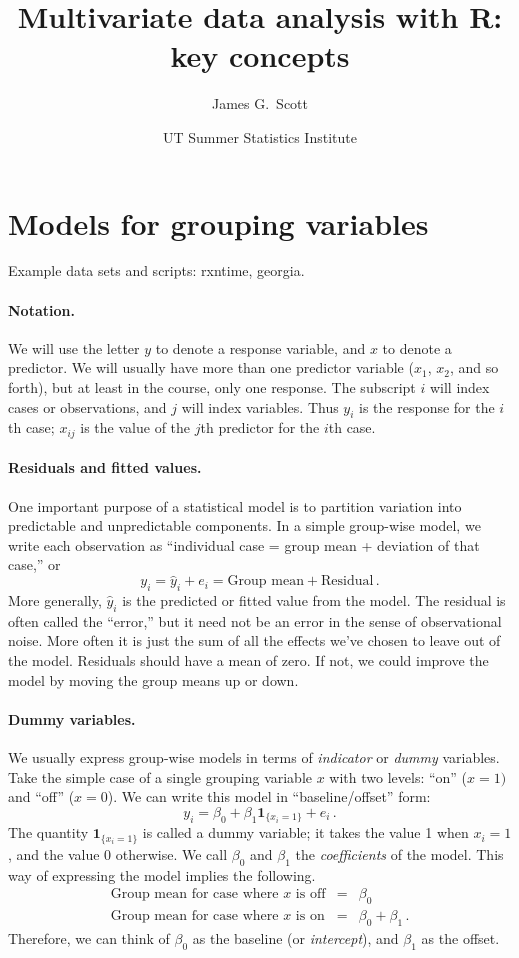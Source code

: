 \documentclass[11pt]{article}
\title{Multivariate data analysis with R: key concepts}
\author{ James G.~Scott}
\date{UT Summer Statistics Institute}  %
\newcommand{\1}[1]{\mathbf{1}_{\{ {#1} \}}}
\begin{document}

\maketitle%


\section{Models for grouping variables}
Example data sets and scripts: rxntime, georgia.

\paragraph{Notation.} We will use the letter $y$ to denote a response variable, and $x$ to denote a predictor.  We will usually have more than one predictor variable ($x_1$, $x_2$, and so forth), but at least in the course, only one response.  The subscript $i$ will index cases or observations, and $j$ will index variables.  Thus $y_i$ is the response for the $i$th case; $x_{ij}$ is the value of the $j$th predictor for the $i$th case.

\paragraph{Residuals and fitted values.}  One important purpose of a statistical model is to partition variation into predictable and unpredictable components.  In a simple group-wise model, we write each observation as ``individual case = group mean + deviation of that case,'' or
$$
y_i = \hat{y}_i + e_i = \mbox{Group mean} + \mbox{Residual} \, .
$$
More generally, $\hat{y}_i$ is the predicted or fitted value from the model.  The residual is often called the ``error,'' but it need not be an error in the sense of observational noise.  More often it is just the sum of all the effects we've chosen to leave out of the model.  Residuals should have a mean of zero.  If not, we could improve the model by moving the group means up or down.

\paragraph{Dummy variables.}  We usually express group-wise models in terms of \textit{indicator} or \textit{dummy} variables.  Take the simple case of a single grouping variable $x$ with two levels: ``on'' ($x=1)$ and ``off'' ($x=0$).  We can write this model in ``baseline/offset'' form:
$$
y_i = \beta_0 + \beta_1 \1{x_i=1} + e_i \, .
$$
The quantity $\1{x_i=1}$ is called a dummy variable; it takes the value 1 when $x_i=1$, and the value 0 otherwise.   We call $\beta_0$ and $\beta_1$ the \textit{coefficients} of the model.  This way of expressing the model implies the following.
\begin{eqnarray*}
\mbox{Group mean for case where $x$ is off} &=& \beta_0 \\
\mbox{Group mean for case where $x$ is on} &=& \beta_0 + \beta_1 \, .
\end{eqnarray*}
Therefore, we can think of $\beta_0$ as the baseline (or \textit{intercept}), and $\beta_1$ as the offset.
\end{document}
